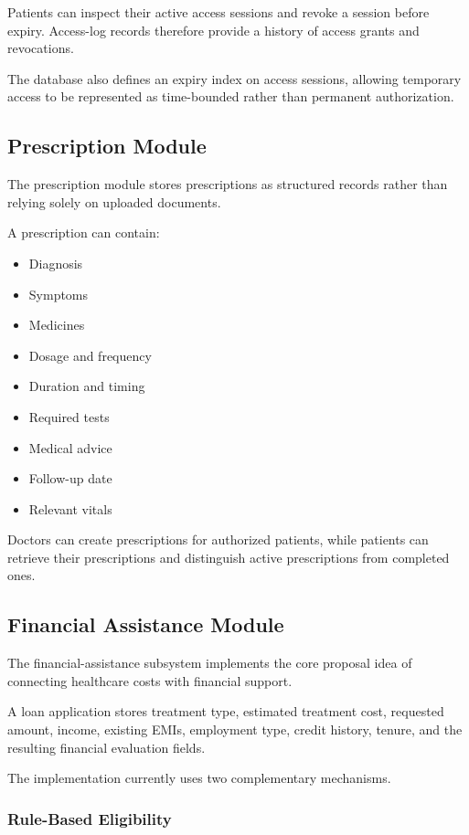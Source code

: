 \documentclass{tietreport}
\begin{document}
Patients can inspect their active access sessions and revoke a session
before expiry. Access-log records therefore provide a history of access
grants and revocations.

The database also defines an expiry index on access sessions, allowing
temporary access to be represented as time-bounded rather than
permanent authorization.

\subsection{Prescription Module}

The prescription module stores prescriptions as structured records
rather than relying solely on uploaded documents.

A prescription can contain:

\begin{itemize}
  \item Diagnosis
  \item Symptoms
  \item Medicines
  \item Dosage and frequency
  \item Duration and timing
  \item Required tests
  \item Medical advice
  \item Follow-up date
  \item Relevant vitals
\end{itemize}

Doctors can create prescriptions for authorized patients, while patients
can retrieve their prescriptions and distinguish active prescriptions
from completed ones.

\subsection{Financial Assistance Module}

The financial-assistance subsystem implements the core proposal idea of
connecting healthcare costs with financial support.

A loan application stores treatment type, estimated treatment cost,
requested amount, income, existing EMIs, employment type, credit
history, tenure, and the resulting financial evaluation fields.

The implementation currently uses two complementary mechanisms.

\subsubsection{Rule-Based Eligibility}
\end{document}
